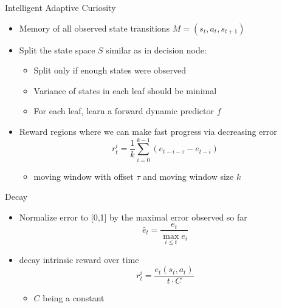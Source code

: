 \begin{frame}[c]{Intelligent Adaptive Curiosity~}
	
	\begin{itemize}
		\item Memory of all observed state transitions $M = (s_t, a_t, s_{t+1})$
		\item Split the state space $S$ similar as in decision node:
		\begin{itemize}
			\item Split only if enough states were observed
			\item Variance of states in each leaf should be minimal
			\item For each leaf, learn a forward dynamic predictor $f$
		\end{itemize}
		\item Reward regions where we can make fast progress via decreasing error
		$$r_t^i = \frac{1}{k} \sum_{i=0}^{k-1} (e_{t-i-\tau} - e_{t-i})$$
		\begin{itemize}
			\item moving window with offset $\tau$ and moving window size $k$
		\end{itemize}
		
	\end{itemize}
	
	
\end{frame}
\begin{frame}[c]{Decay~}
	
	\begin{itemize}
		\item Normalize error to [0,1] by the maximal error observed so far
		$$\bar{e}_t = \frac{e_t}{\max_{i \leq t} e_i} $$
		\item decay intrinsic reward over time
		$$r_t^i = \frac{e_t(s_t, a_t)}{t \cdot C}$$ 
		\begin{itemize}
			\item $C$ being a constant
		\end{itemize}
	\end{itemize}

	
\end{frame}
